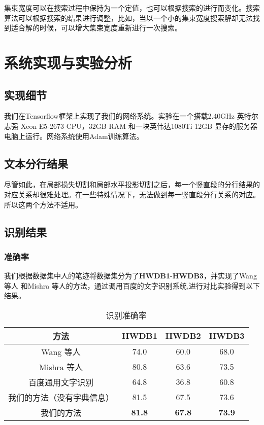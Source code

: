 \documentclass[winfonts]{njuthesis}
\begin{document}
	集束宽度可以在搜索过程中保持为一个定值，也可以根据搜索的进行而变化。搜索算法可以根据搜索的结果进行调整，比如，当以一个小的集束宽度搜索解却无法找到适合解的时候，可以增大集束宽度重新进行一次搜索。
	
\chapter{系统实现与实验分析}

	\section{实现细节}
	我们在Tensorflow框架上实现了我们的网络系统。实验在一个搭载2.40GHz 英特尔志强 Xeon E5-2673 CPU，32GB RAM 和一块英伟达1080Ti 12GB 显存的服务器电脑上运行。网络系统使用Adam训练算法。
	
	\section{文本分行结果}
	尽管如此，在局部损失切割和局部水平投影切割之后，每一个竖直段的分行结果的对应关系却很难处理。在一些特殊情况下，无法做到每一竖直段分行关系的对应。所以这两个方法不适用。
	
	\section{识别结果}

		\subsection{准确率}
		我们根据数据集中人的笔迹将数据集分为了\textbf{HWDB1}-\textbf{HWDB3}，并实现了Wang 等人\cite{wang2012end} 和Mishra 等人\cite{mishra2012scene}的方法，通过调用百度的文字识别系统\cite{baiduapi},进行对比实验得到以下结果。
		
		\vspace{0.2cm}
		\begin{table}[htbp]
		\setlength{\belowcaptionskip}{5pt}
		  \centering
		  \begin{tabular}{cccc}
		    \toprule
		    \textbf{方法} & \textbf{HWDB1} & \textbf{HWDB2} & \textbf{HWDB3} \\
		    \midrule
		    Wang 等人\cite{wang2012end}   			& 74.0 & 60.0 & 68.0  \\
		    Mishra 等人\cite{mishra2012scene}		 	& 80.8 & 63.6 & 73.5  \\
		    百度通用文字识别\cite{baiduapi}		& 64.8 & 36.8 & 60.8 \\
		    \midrule
		    我们的方法（没有字典信息）& 81.5 & 67.5 & 73.6  \\
		    我们的方法	  		& \textbf{81.8} & \textbf{67.8} & \textbf{73.9}  \\
		    \bottomrule
		  \end{tabular}
		  \vspace{0.2cm}
		  \caption{识别准确率}\label{table:result}
		\end{table}
\end{document}
